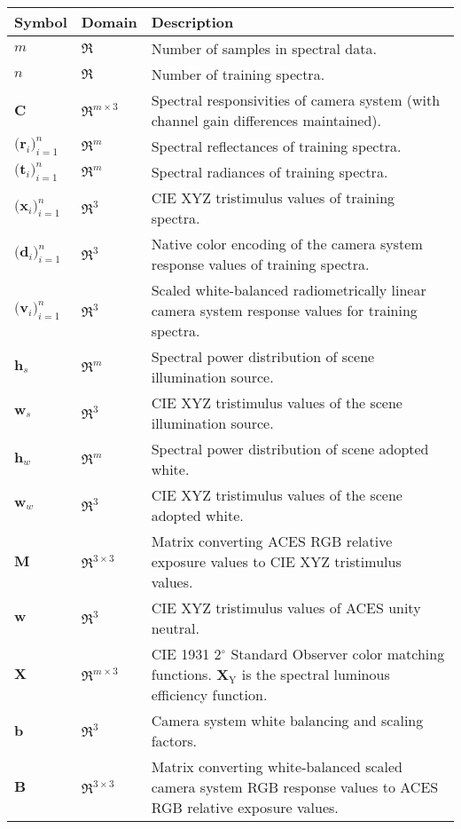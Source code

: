 {\renewcommand{\arraystretch}{1.25}
\begin{tabularx}{\textwidth}{|l|l|X|}
	\hline
	\bfseries{Symbol} & \bfseries{Domain} & \bfseries{Description} \\ \hline
	$m$ & $\Re$ & Number of samples in spectral data. \\ \hline
	$n$ & $\Re$ & Number of training spectra. \\ \hline
	$\mathbf{C}$ & $\Re^{m\times3}$ & Spectral responsivities of camera system (with channel gain differences maintained). \\ \hline
	$\big(\mathbf{r}_{i}\big)^{n}_{i=1}$ & $\Re^m$ & Spectral reflectances of training spectra. \\ \hline
	$\big(\mathbf{t}_{i}\big)^{n}_{i=1}$ & $\Re^m$ & Spectral radiances of training spectra. \\ \hline
	$\big(\mathbf{x}_{i}\big)^{n}_{i=1}$ & $\Re^3$ & CIE XYZ tristimulus values of training spectra. \\ \hline
	$\big(\mathbf{d}_{i}\big)^{n}_{i=1}$ & $\Re^3$ & Native color encoding of the camera system response values of training spectra. \\ \hline
	$\big(\mathbf{v}_{i}\big)^{n}_{i=1}$ & $\Re^3$ & Scaled white-balanced radiometrically linear camera system response values for training spectra. \\ \hline
	$\mathbf{h}_s$ & $\Re^m$ & Spectral power distribution of scene illumination source. \\ \hline
	$\mathbf{w}_s$ & $\Re^3$ & CIE XYZ tristimulus values of the scene illumination source. \\ \hline
	$\mathbf{h}_w$ & $\Re^m$ & Spectral power distribution of scene adopted white. \\ \hline	
	$\mathbf{w}_w$ & $\Re^3$ & CIE XYZ tristimulus values of the scene adopted white. \\ \hline
	$\mathbf{M}$ & $\Re^{3\times3}$ & Matrix converting ACES RGB relative exposure values to CIE XYZ tristimulus values. \\ \hline
	$\mathbf{w}$ & $\Re^3$ & CIE XYZ tristimulus values of ACES unity neutral. \\ \hline
	$\mathbf{X}$ & $\Re^{m\times3}$ & CIE 1931 2$^\circ$ Standard Observer color matching functions. $\mathbf{X}_\mathrm{Y}$ is the spectral luminous efficiency function. \\ \hline
	$\mathbf{b}$ & $\Re^3$ & Camera system white balancing and scaling factors. \\ \hline
	$\mathbf{B}$ & $\Re^{3\times3}$ & Matrix converting white-balanced scaled camera system RGB response values to ACES RGB relative exposure values. \\ \hline

\end{tabularx}}
